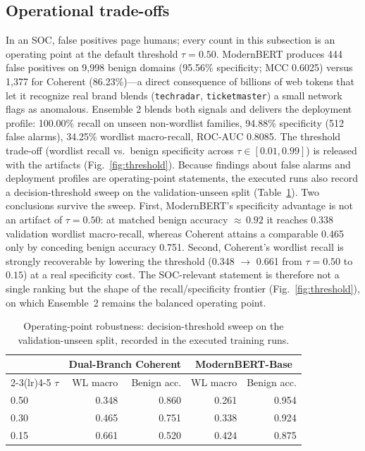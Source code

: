 \documentclass[conference]{IEEEtran}
\begin{document}
\subsection{Operational trade-offs}
In an SOC, false positives page humans; every count in this subsection is an operating point at the default threshold $\tau = 0.50$. ModernBERT produces 444 false positives on 9{,}998 benign domains (95.56\% specificity; MCC 0.6025) versus 1{,}377 for Coherent (86.23\%)---a direct consequence of billions of web tokens that let it recognize real brand blends (\texttt{techradar}, \texttt{ticketmaster}) a small network flags as anomalous. Ensemble 2 blends both signals and delivers the deployment profile: 100.00\% recall on unseen non-wordlist families, 94.88\% specificity (512 false alarms), 34.25\% wordlist macro-recall, ROC-AUC 0.8085. The threshold trade-off (wordlist recall vs.\ benign specificity across $\tau \in [0.01, 0.99]$) is released with the artifacts (Fig.~\ref{fig:threshold}). Because findings about false alarms and deployment profiles are operating-point statements, the executed runs also record a decision-threshold sweep on the validation-unseen split (Table~\ref{tab:threshold}). Two conclusions survive the sweep. First, ModernBERT's specificity advantage is not an artifact of $\tau = 0.50$: at matched benign accuracy ${\approx}\,0.92$ it reaches 0.338 validation wordlist macro-recall, whereas Coherent attains a comparable 0.465 only by conceding benign accuracy 0.751. Second, Coherent's wordlist recall is strongly recoverable by lowering the threshold (0.348 $\to$ 0.661 from $\tau = 0.50$ to $0.15$) at a real specificity cost. The SOC-relevant statement is therefore not a single ranking but the shape of the recall/specificity frontier (Fig.~\ref{fig:threshold}), on which Ensemble~2 remains the balanced operating point.

\begin{table}[t]
\centering
\caption{Operating-point robustness: decision-threshold sweep on the validation-unseen split, recorded in the executed training runs.}
\label{tab:threshold}
\footnotesize
\setlength{\tabcolsep}{4.5pt}
\begin{tabular}{@{}lrrrr@{}}
\toprule
& \multicolumn{2}{c}{Dual-Branch Coherent} & \multicolumn{2}{c}{ModernBERT-Base} \\
\cmidrule(lr){2-3}\cmidrule(lr){4-5}
$\tau$ & WL macro & Benign acc. & WL macro & Benign acc. \\
\midrule
0.50 & 0.348 & 0.860 & 0.261 & 0.954 \\
0.30 & 0.465 & 0.751 & 0.338 & 0.924 \\
0.15 & 0.661 & 0.520 & 0.424 & 0.875 \\
\bottomrule
\end{tabular}
\end{table}
\end{document}
